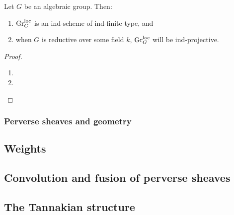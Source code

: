                    \begin{proposition} \label{prop: structure_of_affine_grasmannian}
                        Let $G$ be an algebraic group. Then:
                            \begin{enumerate}
                                \item $\mathrm{Gr}_G^{\mathrm{loc}}$ is an ind-scheme of ind-finite type, and
                                \item when $G$ is reductive over some field $k$, $\mathrm{Gr}_G^{\mathrm{loc}}$ will be ind-projective.
                            \end{enumerate}
                    \end{proposition}
                        \begin{proof}
                            \noindent
                            \begin{enumerate}
                                \item 
                                \item 
                            \end{enumerate}
                        \end{proof}
            
            \subsubsection{Perverse sheaves and geometry}
            
        \subsection{Weights}
        
        \subsection{Convolution and fusion of perverse sheaves}
        
        \subsection{The Tannakian structure}